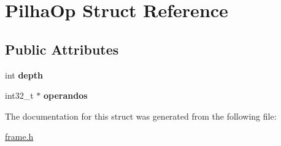 \hypertarget{structPilhaOp}{}\section{Pilha\+Op Struct Reference}
\label{structPilhaOp}
\subsection*{Public Attributes}
\begin{DoxyCompactItemize}
\item 
\mbox{\label{structPilhaOp_ad3fdbfc30e2a1b62169ce905a3af6a39}} 
int {\bfseries depth}
\item 
\mbox{\label{structPilhaOp_a66868e47a39d4f335823ae7de24947bf}} 
int32\+\_\+t $\ast$ {\bfseries operandos}
\end{DoxyCompactItemize}


The documentation for this struct was generated from the following file\+:\begin{DoxyCompactItemize}
\item 
\hyperlink{frame_8h}{frame.\+h}\end{DoxyCompactItemize}
